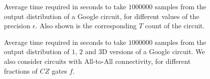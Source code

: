 \begin{figure}[t]
\centering
\begin{scaletikzpicturetowidth}{0.75\textwidth}

\end{scaletikzpicturetowidth}
\caption{Average time required in seconds to take $1000000$ samples from the output distribution of a Google circuit, for different values of the precision $\epsilon$. Also shown is the corresponding $T$ count of the circuit.}\label{fig:precision_runtimes}
\end{figure}
\begin{figure}[t]
\centering
% 
\caption{Average time required in seconds to take $1000000$ samples from the output distribution of $1$, $2$ and $3$D versions of a Google circuit. We also consider circuits with All-to-All connectivity, for different fractions of $CZ$ gates $f$.}\label{fig:connectivity_runtimes}
\end{figure}
